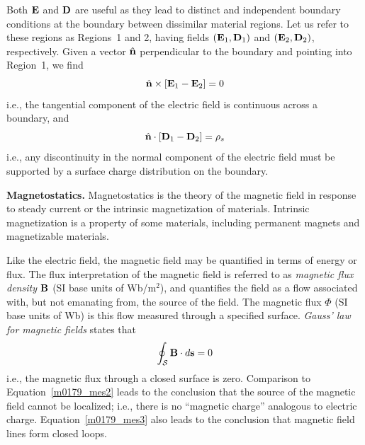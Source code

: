 
Both ${\bf E}$ and ${\bf D}$ are useful as they lead to distinct and independent boundary conditions 
at the boundary between dissimilar material regions.
Let us refer to these regions as Regions~1 and 2, having fields $({\bf E}_1,{\bf D}_1)$ and $({\bf E}_2,{\bf D}_2)$, respectively.  
Given a vector $\hat{\bf n}$ perpendicular to the boundary and pointing into Region~1, we find 
%
\begin{equation}
\hat{\bf n}\times\left[{\bf E}_1-{\bf E}_2\right] = 0
\end{equation}
%
i.e., the tangential component of the electric field is continuous across a boundary, and
%
\begin{equation}
\hat{\bf n}\cdot\left[{\bf D}_1-{\bf D}_2\right] = \rho_s
\end{equation}
%
i.e., any discontinuity in the normal component of the electric field must be supported by a surface charge distribution on the boundary. 

{\bf Magnetostatics.}  
Magnetostatics is the theory of the magnetic field in response to steady current or the intrinsic magnetization of materials.
Intrinsic magnetization is a property of some materials, including permanent magnets and magnetizable materials. 

Like the electric field, the magnetic field may be quantified in terms of energy or flux.
The flux interpretation of the magnetic field is referred to as \emph{magnetic flux density} 
${\bf B}$ (SI base units of Wb/m$^2$), and quantifies the field as a flow associated with, but not emanating from, the source of the field.  
The magnetic flux 
$\Phi$ (SI base units of Wb) is this flow measured through a specified surface. 
\emph{Gauss' law for magnetic fields} 
states that 
%
\begin{equation}
\oint_{\mathcal{S}} {\bf B}\cdot d{\bf s} = 0
\label{m0179_mes3}
\end{equation}
% 
i.e., the magnetic flux through a closed surface is zero.
Comparison to Equation~\ref{m0179_mes2} leads to the conclusion that the source of the magnetic field cannot be localized; i.e., there is no ``magnetic charge'' analogous to electric charge.  
Equation~\ref{m0179_mes3} also leads to the conclusion that magnetic field lines form closed loops.

